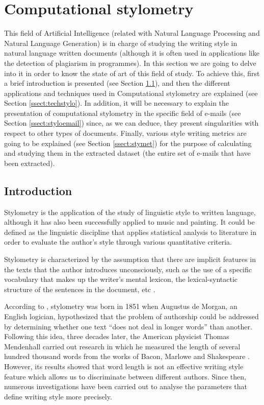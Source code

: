 \section{Computational stylometry}
This field of Artificial Intelligence (related with Natural Language Processing and Natural Language Generation) is in charge of studying the writing style in natural language written documents (although it is often used in applications like the detection of plagiarism in programmes). In this section we are going to delve into it in order to know the state of art of this field of study. To achieve this, first a brief introduction is presented (see Section \ref{ssect:introstylo}), and then the different applications and techniques used in Computational stylometry are explained (see Section \ref{ssect:techstylo}). In addition, it will be necessary to explain the presentation of computational stylometry in the specific field of e-mails (see Section \ref{ssect:styloemail}) since, as we can deduce, they present singularities with respect to other types of documents. Finally, various style writing metrics are going to be explained (see Section \ref{ssect:stymet}) for the purpose of calculating and studying them in the extracted dataset (the entire set of e-mails that have been extracted).

\subsection{Introduction}\label{ssect:introstylo}
Stylometry \citep{wiki:stylometry} is the application of the study of linguistic style to written language, although it has also been successfully applied to music and painting. It could be defined as the linguistic discipline that applies statistical analysis to literature in order to evaluate the author's style through various quantitative criteria.

Stylometry is characterized by the assumption that there are implicit features in the texts that the author introduces unconsciously, such as the use of a specific vocabulary that makes up the writer's mental lexicon, the lexical-syntactic structure of the sentences in the document, etc \citep{burrows1992computers}.

According to \cite{stylohist}, stylometry was born in 1851 when Augustus de Morgan, an English logician, hypothesized that the problem of authorship could be addressed by determining whether one text ``does not deal in longer words'' \citep{morganletters} than another. Following this idea, three decades later, the American physicist Thomas Mendenhall carried out research in which he measured the length of several hundred thousand words from the works of Bacon, Marlowe and Shakespeare \citep{mendenhall1887}. However, its results showed that word length is not an effective writing style feature which allows us to discriminate between different authors. Since then, numerous investigations have been carried out to analyse the parameters that define writing style more precisely.

